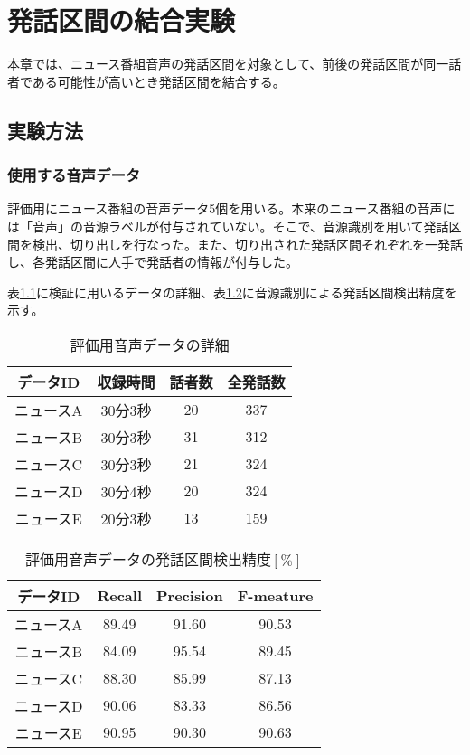 \chapter{発話区間の結合実験}
本章では、ニュース番組音声の発話区間を対象として、前後の発話区間が同一話者である可能性が高いとき発話区間を結合する。
\section{実験方法}
\subsection{使用する音声データ}
\par
評価用にニュース番組の音声データ5個を用いる。本来のニュース番組の音声には「音声」の音源ラベルが付与されていない。そこで、音源識別を用いて発話区間を検出、切り出しを行なった。また、切り出された発話区間それぞれを一発話し、各発話区間に人手で発話者の情報が付与した。\par
表\ref{table:test_detail}に検証に用いるデータの詳細、表\ref{table:test_detail_RPF}に音源識別による発話区間検出精度を示す。

\begin{table}[htb]
\label{table:test_detail}
  \begin{center}
    \caption{評価用音声データの詳細}
    \begin{tabular}{|c||c|c|c|} \hline
      データID & 収録時間 & 話者数 & 全発話数 \\ \hline
      ニュースA & 30分3秒 & 20 & 337 \\ \hline
      ニュースB & 30分3秒 & 31 & 312\\ \hline
      ニュースC & 30分3秒 & 21 & 324 \\ \hline
      ニュースD & 30分4秒 & 20 & 324\\ \hline
      ニュースE & 20分3秒 & 13 & 159\\ \hline
    \end{tabular}
  \end{center}
\end{table}

\begin{table}[htb]
\label{table:test_detail_RPF}
  \begin{center}
    \caption{評価用音声データの発話区間検出精度$[\%]$}
    \begin{tabular}{|c||c|c|c|} \hline
      データID & Recall & Precision & F-meature \\ \hline
      ニュースA & 89.49 & 91.60 & 90.53 \\ \hline
      ニュースB & 84.09 & 95.54 & 89.45\\ \hline
      ニュースC & 88.30 & 85.99 & 87.13 \\ \hline
      ニュースD & 90.06 & 83.33 & 86.56\\ \hline
      ニュースE & 90.95 & 90.30 & 90.63\\ \hline
    \end{tabular}
  \end{center}
\end{table}

